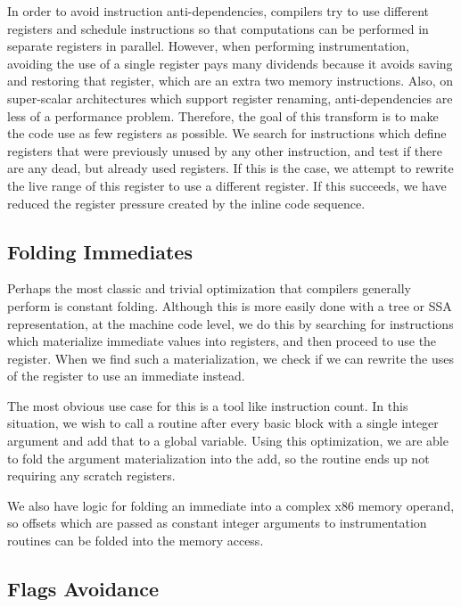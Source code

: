 In order to avoid instruction anti-dependencies, compilers try to use different
registers and schedule instructions so that computations can be performed in
separate registers in parallel.  However, when performing instrumentation,
avoiding the use of a single register pays many dividends because it avoids
saving and restoring that register, which are an extra two memory instructions.
Also, on super-scalar architectures which support register
renaming\cite{reg_renaming}, anti-dependencies are less of a performance
problem.  Therefore, the goal of this transform is to make the code use as few
registers as possible.  We search for instructions which define registers that
were previously unused by any other instruction, and test if there are any dead,
but already used registers.  If this is the case, we attempt to rewrite the live
range of this register to use a different register.  If this succeeds, we have
reduced the register pressure created by the inline code sequence.

\subsection{Folding Immediates}

Perhaps the most classic and trivial optimization that compilers generally
perform is constant folding.  Although this is more easily done with a tree or
SSA representation, at the machine code level, we do this by searching for
instructions which materialize immediate values into registers, and then proceed
to use the register.  When we find such a materialization, we check if we can
rewrite the uses of the register to use an immediate instead.

The most obvious use case for this is a tool like instruction count.  In this
situation, we wish to call a routine after every basic block with a single
integer argument and add that to a global variable.  Using this optimization, we
are able to fold the argument materialization into the add, so the routine ends
up not requiring any scratch registers.

We also have logic for folding an immediate into a complex x86 memory operand,
so offsets which are passed as constant integer arguments to instrumentation
routines can be folded into the memory access.

\subsection{Flags Avoidance}

